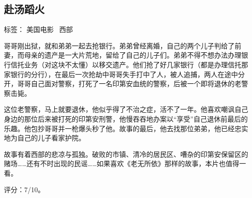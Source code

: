 \subsection{赴汤蹈火}

标签： 美国电影 \  西部

哥哥刚出狱，就和弟弟一起去抢银行。弟弟曾经离婚，自己的两个儿子判给了前妻，而母亲的遗产是一大片荒地，留给了自己的儿子们。弟弟不得不想办法办理银行信托业务（对这块不太懂）以移交遗产。他们抢了好几家银行（都是办理信托那家银行的分行），在最后一次抢劫中哥哥失手打中了人，被人追捕，两人在途中分开，哥哥自己面对警察，打死了一名印第安血统的警察，后被一个即将退休的老警察击毙。

这位老警察，马上就要退休，他似乎得了不治之症，活不了一年。他喜欢嘲讽自己身边的那位后来被打死的印第安刑警，他慢吞吞地办案以“享受”自己退休前最后的乐趣。他包抄哥哥并一枪爆头秒了他。故事的最后，他去找那位弟弟，他已经忠实地为自己的儿子看家护院。

故事有着西部的悲凉与孤独。破败的市镇、清冷的居民区、嘈杂的印第安保留区的赌场……还有不时出现的民谣……如果喜欢《老无所依》那样的故事，本片也值得一看。

评分：7/10。
